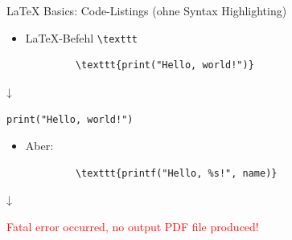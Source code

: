 \documentclass[main.tex]{subfiles}
\begin{document}
\begin{frame}[fragile]{\LaTeX{} Basics: Code-Listings (ohne Syntax Highlighting)}
	\begin{itemize}
		\item \LaTeX-Befehl \verb|\texttt|
	\end{itemize}
	\pause
	\vspace{-10pt}
	\begin{center}
		\begin{verbatim}
            \texttt{print("Hello, world!")}
        \end{verbatim}
		\vspace{-17pt}
		↓

		\texttt{print("Hello, world!")}
	\end{center}
	\pause
	\vspace{-7pt}
	\begin{itemize}
		\item Aber:
	\end{itemize}
	\pause
	\vspace{-10pt}
	\begin{center}
		\begin{verbatim}
            \texttt{printf("Hello, %s!", name)}
        \end{verbatim}
		\vspace{-17pt}
		↓

		\textcolor{red}{Fatal error occurred, no output PDF file produced!}
	\end{center}
\end{frame}
\end{document}
